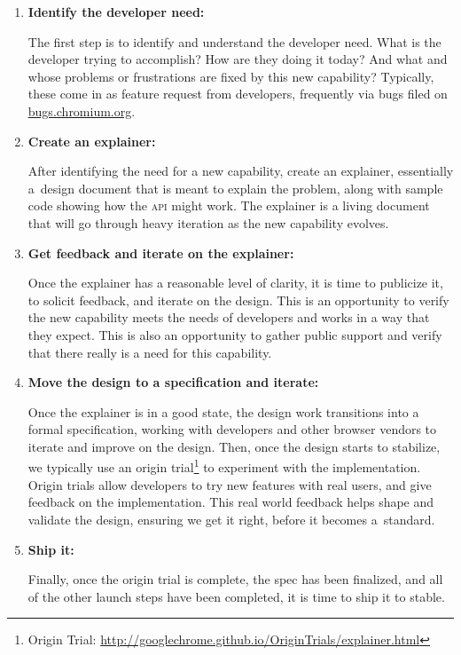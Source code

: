 \documentclass[sigconf, anonymous]{acmart}
\begin{document}
\begin{enumerate}  
  \item \textbf{Identify the developer need:}
  
  The first step is to identify and understand the developer need.
  What is the developer trying to accomplish?
  How are they doing it today? And what and whose problems or frustrations
  are fixed by this new capability? Typically, these come in as feature request
  from developers, frequently via bugs filed on \url{bugs.chromium.org}.

  \item \textbf{Create an explainer:}

  After identifying the need for a new capability, create an explainer,
  essentially a~design document that is meant to explain the problem,
  along with sample code showing how the \textsc{api} might work.
  The explainer is a living document that will go through heavy iteration
  as the new capability evolves.

  \item \textbf{Get feedback and iterate on the explainer:}

  Once the explainer has a reasonable level of clarity,
  it is time to publicize it, to solicit feedback, and iterate on the design.
  This is an opportunity to verify the new capability meets the needs of developers
  and works in a way that they expect. This is also an opportunity to gather
  public support and verify that there really is a need for this capability.

  \item \textbf{Move the design to a specification and iterate:}
  
  Once the explainer is in a good state,
  the design work transitions into a formal specification,
  working with developers and other browser vendors to iterate and improve on the design.
  Then, once the design starts to stabilize, we typically use an
  origin trial\footnote{Origin Trial: \url{http://googlechrome.github.io/OriginTrials/explainer.html}}
  to experiment with the implementation.
  Origin trials allow developers to try new features with real users,
  and give feedback on the implementation.
  This real world feedback helps shape and validate the design,
  ensuring we get it right, before it becomes a~standard.

  \item \textbf{Ship it:}

  Finally, once the origin trial is complete, the spec has been finalized,
  and all of the other launch steps have been completed, it is time to ship it to stable.  
\end{enumerate}
\end{document}
